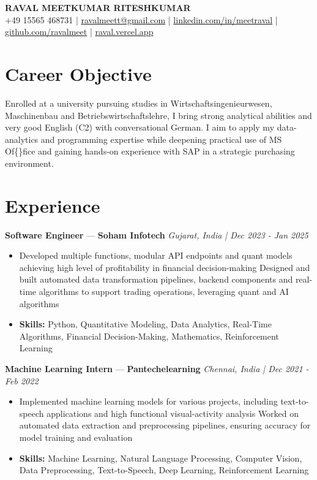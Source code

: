 \documentclass[a4paper,10pt]{article}
\begin{document}
\begin{center}
  {\Large\bfseries RAVAL MEETKUMAR RITESHKUMAR}\\[2pt]
  {\small +49 15565 468731 \;|\; \href{mailto:ravalmeett@gmail.com}{ravalmeett@gmail.com} \;|\; \href{https://www.linkedin.com/in/meetraval/}{linkedin.com/in/meetraval} \;|\; \href{https://github.com/ravalmeet}{github.com/ravalmeet} \;|\; \href{https://raval.vercel.app/}{raval.vercel.app}}
\end{center}
\vspace{-3pt}

\section*{Career Objective}
Enrolled at a university pursuing studies in Wirtschaftsingenieurwesen, Maschinenbau and Betriebswirtschaftslehre, I bring strong analytical abilities and very good English (C2) with conversational German. I aim to apply my data-analytics and programming expertise while deepening practical use of MS Of\{\}fice and gaining hands-on experience with SAP in a strategic purchasing environment.\par

\section*{Experience}
\textbf{Software Engineer} — \textbf{Soham Infotech} \hfill \textit{Gujarat, India \;|\; Dec 2023 - Jan 2025}\par
\vspace{1pt}
\begin{itemize}
  \item Developed multiple functions, modular API endpoints and quant models achieving high level of profitability in financial decision-making Designed and built automated data transformation pipelines, backend components and real-time algorithms to support trading operations, leveraging quant and AI algorithms
  \item \textbf{Skills:} Python, Quantitative Modeling, Data Analytics, Real-Time Algorithms, Financial Decision-Making, Mathematics, Reinforcement Learning
\end{itemize}
\vspace{3pt}
\textbf{Machine Learning Intern} — \textbf{Pantechelearning} \hfill \textit{Chennai, India \;|\; Dec 2021 - Feb 2022}\par
\vspace{1pt}
\begin{itemize}
  \item Implemented machine learning models for various projects, including text-to-speech applications and high functional visual-activity analysis Worked on automated data extraction and preprocessing pipelines, ensuring accuracy for model training and evaluation
  \item \textbf{Skills:} Machine Learning, Natural Language Processing, Computer Vision, Data Preprocessing, Text-to-Speech, Deep Learning, Reinforcement Learning
\end{itemize}
\end{document}
